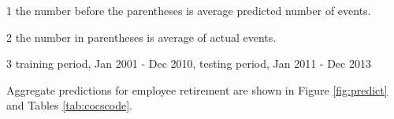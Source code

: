 \documentclass[12pt,letterpaper]{article}
\begin{document}
\begin{table}[h!]
\begin{threeparttable}
%			
		\begin{tablenotes}
			\item[1] the number before the parentheses is average predicted number of events.
			\item[2] the number in parentheses is average of actual events.
            \item[3] training period, Jan 2001 - Dec 2010, testing period, Jan 2011 - Dec 2013
		\end{tablenotes}
		
	\end{threeparttable}
	\label{tab:cocscode}
\end{table}
 Aggregate predictions for employee retirement are shown in Figure \ref{fig:predict} and Tables \ref{tab:cocscode}. %
\end{document}
